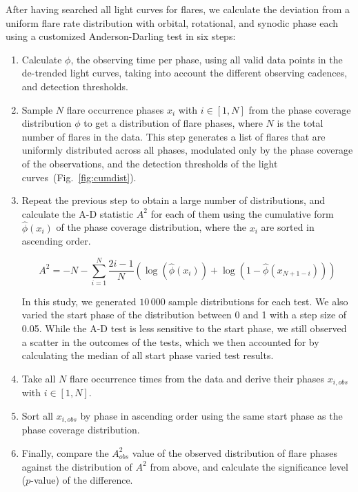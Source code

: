 \documentclass[fleqn,usenatbib]{mnras}%
\begin{document}
After having searched all light curves for flares, we calculate the deviation from a uniform flare rate distribution with orbital, rotational, and synodic phase each using a customized Anderson-Darling test in six steps:
\begin{enumerate}
\item Calculate $\phi$, the observing time per phase, using all valid data points in the de-trended light curves, taking into account the different observing cadences, and detection thresholds.
\item Sample $N$ flare occurrence phases $x_i$ with $i \in [1,N]$ from the phase coverage distribution $\phi$ to get a distribution of flare phases, where $N$ is the total number of flares in the data. This step generates a list of flares that are uniformly distributed across all phases, modulated only by the phase coverage of the observations, and the detection thresholds of the light curves~(Fig.~\ref{fig:cumdist}). 
\item Repeat the previous step to obtain a large number of distributions, and calculate the A-D statistic $A^2$ for each of them using the cumulative form $\hat{\phi}(x_i)$ of the phase coverage distribution, where the $x_i$ are sorted in ascending order. 

\begin{equation}
A^2 = - N -\displaystyle\sum_{i=1}^N \dfrac{2i-1}{N}\left(\log(\hat{\phi}(x_i))+\log(1-\hat{\phi}(x_{N+1-i}))\right)
\end{equation}

In this study, we generated $10\,000$ sample distributions for each test. We also varied the start phase of the distribution between 0 and 1 with a step size of 0.05. While the A-D test is less sensitive to the start phase, we still observed a scatter in the outcomes of the tests, which we then accounted for by calculating the median of all start phase varied test results.
\item Take all $N$ flare occurrence times from the data and derive their phases $x_{i,obs}$ with $i \in [1,N]$. 
\item Sort all $x_{i,obs}$ by phase in ascending order using the same start phase as the phase coverage distribution.
\item Finally, compare the $A^2_{obs}$ value of the observed distribution of flare phases against the distribution of $A^2$ from above, and calculate the significance level ($p$-value) of the difference. 
\end{enumerate}
\end{document}
